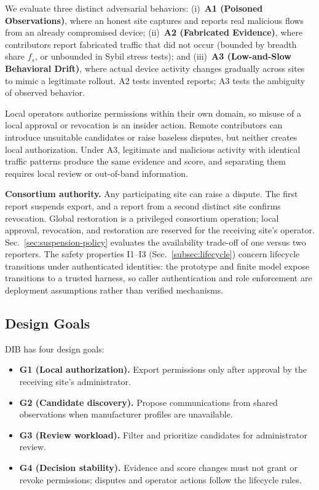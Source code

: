\documentclass[journal]{IEEEtran}
\theoremstyle{definition}
\begin{document}
We evaluate three distinct adversarial behaviors: (i)~\textbf{A1 (Poisoned Observations)}, where an honest site captures and reports real malicious flows from an already compromised device; (ii)~\textbf{A2 (Fabricated Evidence)}, where contributors report fabricated traffic that did not occur (bounded by breadth share $f_s$, or unbounded in Sybil stress tests); and (iii)~\textbf{A3 (Low-and-Slow Behavioral Drift)}, where actual device activity changes gradually across sites to mimic a legitimate rollout. A2 tests invented reports; A3 tests the ambiguity of observed behavior.

Local operators authorize permissions within their own domain, so misuse of a local approval or revocation is an insider action. Remote contributors can introduce unsuitable candidates or raise baseless disputes, but neither creates local authorization. Under A3, legitimate and malicious activity with identical traffic patterns produce the same evidence and score, and separating them requires local review or out-of-band information.

\textbf{Consortium authority.} Any participating site can raise a dispute. The first report suspends export, and a report from a second distinct site confirms revocation. Global restoration is a privileged consortium operation; local approval, revocation, and restoration are reserved for the receiving site's operator. Sec.~\ref{sec:suspension-policy} evaluates the availability trade-off of one versus two reporters. The safety properties I1--I3 (Sec.~\ref{subsec:lifecycle}) concern lifecycle transitions under authenticated identities: the prototype and finite model expose transitions to a trusted harness, so caller authentication and role enforcement are deployment assumptions rather than verified mechanisms.

\subsection{Design Goals}
DIB has four design goals:
\begin{itemize}
\item \textbf{G1 (Local authorization).} Export permissions only after approval by the receiving site's administrator.
\item \textbf{G2 (Candidate discovery).} Propose communications from shared observations when manufacturer profiles are unavailable.
\item \textbf{G3 (Review workload).} Filter and prioritize candidates for administrator review.
\item \textbf{G4 (Decision stability).} Evidence and score changes must not grant or revoke permissions; disputes and operator actions follow the lifecycle rules.
\end{itemize}
\end{document}
